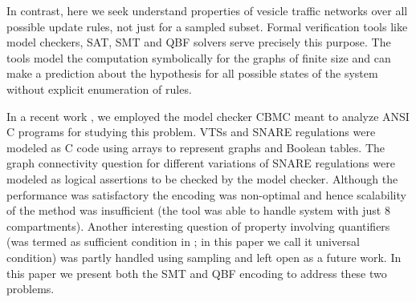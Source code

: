 %
%
%
%
%
%
%
%

In contrast, here we seek understand properties of vesicle traffic networks over all possible update rules, not just for a sampled subset.
%
Formal verification tools like model checkers, SAT,  SMT and QBF solvers serve precisely this purpose. 
%
The tools model the computation symbolically for the graphs of finite size and can make a prediction about the hypothesis for all possible states of the system without explicit enumeration of rules. 
%

In a recent work \cite{shukla2017discovering}, we employed the model checker CBMC \cite{ckl2004} meant to analyze ANSI C programs for studying this problem. 
%
VTSs and SNARE regulations were modeled as C code using arrays to represent graphs and Boolean tables. 
%
The graph connectivity question for different variations of SNARE regulations were modeled as logical assertions to be checked by the model checker. 
%
Although the performance was satisfactory the encoding was non-optimal and hence scalability of the method was insufficient (the tool was able to handle system with just 8 compartments).
%
Another interesting question of property involving quantifiers (was termed as sufficient condition in \cite{shukla2017discovering}; in this paper we call it universal condition) was partly handled using sampling and left open as a future work.
%
In this paper we present both the SMT and QBF encoding to address these two problems.
%
%


